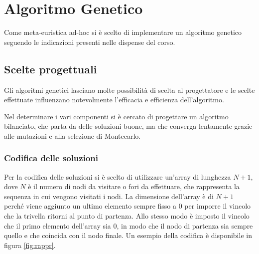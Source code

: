 
\FloatBarrier
\section{Algoritmo Genetico}\label{sec:genetico}

Come meta-euristica ad-hoc si è scelto di implementare un algoritmo genetico seguendo le indicazioni presenti nelle dispense del corso.

\subsection{Scelte progettuali}

Gli algoritmi genetici lasciano molte possibilità di scelta al progettatore e le scelte effettuate influenzano notevolmente l'efficacia e efficienza dell'algoritmo.

Nel determinare i vari componenti si è cercato di progettare un algoritmo bilanciato, che parta da delle soluzioni buone, ma che converga lentamente grazie alle mutazioni e alla selezione di Montecarlo.

\subsubsection{Codifica delle soluzioni}

Per la codifica delle soluzioni si è scelto di utilizzare un'array di lunghezza $N+1$, dove $N$ è il numero di nodi da visitare o fori da effettuare, che rappresenta la sequenza in cui vengono visitati i nodi. La dimensione dell'array è di $N+1$ perché viene aggiunto un ultimo elemento sempre fisso a $0$ per imporre il vincolo che la trivella ritorni al punto di partenza.
Allo stesso modo è imposto il vincolo che il primo elemento dell'array sia 0, in modo che il nodo di partenza sia sempre quello e che coincida con il nodo finale. Un esempio della codifica è disponibile in figura \ref{fig:rappr}.

